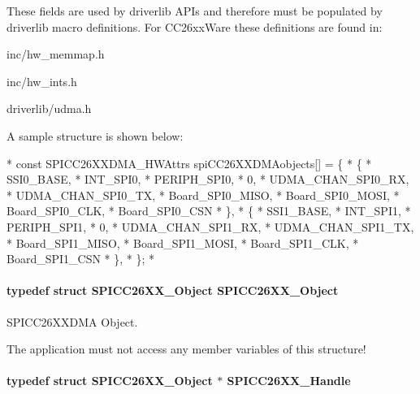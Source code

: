 These fields are used by driverlib A\-P\-Is and therefore must be populated by driverlib macro definitions. For C\-C26xx\-Ware these definitions are found in\-:
\begin{DoxyItemize}
\item inc/hw\-\_\-memmap.\-h
\item inc/hw\-\_\-ints.\-h
\item driverlib/udma.\-h
\end{DoxyItemize}

A sample structure is shown below\-: 
\begin{DoxyCode}
*  \textcolor{keyword}{const} SPICC26XXDMA\_HWAttrs spiCC26XXDMAobjects[] = \{
*      \{
*          SSI0\_BASE,
*          INT\_SPI0,
*          PERIPH\_SPI0,
*          0,
*          UDMA\_CHAN\_SPI0\_RX,
*          UDMA\_CHAN\_SPI0\_TX,
*          Board\_SPI0\_MISO,
*          Board\_SPI0\_MOSI,
*          Board\_SPI0\_CLK,
*          Board\_SPI0\_CSN
*      \},
*      \{
*          SSI1\_BASE,
*          INT\_SPI1,
*          PERIPH\_SPI1,
*          0,
*          UDMA\_CHAN\_SPI1\_RX,
*          UDMA\_CHAN\_SPI1\_TX,
*          Board\_SPI1\_MISO,
*          Board\_SPI1\_MOSI,
*          Board\_SPI1\_CLK,
*          Board\_SPI1\_CSN
*      \},
*  \};
*  
\end{DoxyCode}
\paragraph[{S\-P\-I\-C\-C26\-X\-X\-\_\-\-Object}]{\setlength{\rightskip}{0pt plus 5cm}typedef struct {\bf S\-P\-I\-C\-C26\-X\-X\-\_\-\-Object}  {\bf S\-P\-I\-C\-C26\-X\-X\-\_\-\-Object}}\label{_s_p_i_c_c26_x_x_d_m_a_8h_a4e4c18a99d7f9d331ed9d2f21975e8c2}


S\-P\-I\-C\-C26\-X\-X\-D\-M\-A Object. 

The application must not access any member variables of this structure! 
\paragraph[{S\-P\-I\-C\-C26\-X\-X\-\_\-\-Handle}]{\setlength{\rightskip}{0pt plus 5cm}typedef struct {\bf S\-P\-I\-C\-C26\-X\-X\-\_\-\-Object} $\ast$ {\bf S\-P\-I\-C\-C26\-X\-X\-\_\-\-Handle}}\label{_s_p_i_c_c26_x_x_d_m_a_8h_a4da256c4dcd9175655207a9508358b6c}



